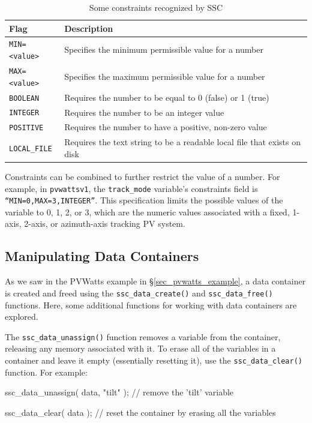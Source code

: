 \documentclass{scrartcl} %
\begin{document}
\begin{table}[ht]
\begin{center}
\begin{tabular}{ll}
Flag & Description\\
\hline
\texttt{MIN=<value>} & Specifies the minimum permissible value for a number \\
\texttt{MAX=<value>} & Specifies the maximum permissible value for a number \\
\texttt{BOOLEAN} & Requires the number to be equal to 0 (false) or 1 (true) \\
\texttt{INTEGER} & Requires the number to be an integer value \\
\texttt{POSITIVE} & Requires the number to have a positive, non-zero value \\
\texttt{LOCAL\_FILE} & Requires the text string to be a readable local file that exists on disk \\
\end{tabular}
\caption{Some constraints recognized by SSC}
\label{tab_constraints}
\end{center}
\end{table}

Constraints can be combined to further restrict the value of a number.  For example, in \texttt{pvwattsv1}, the \texttt{track\_mode} variable's constraints field is \texttt{``MIN=0,MAX=3,INTEGER''}.  This specification limits the possible values of the variable to 0, 1, 2, or 3, which are the numeric values associated with a fixed, 1-axis, 2-axis, or azimuth-axis tracking PV system.

\subsection{Manipulating Data Containers}
\label{sec_data_manip}

As we saw in the PVWatts example in \S\ref{sec_pvwatts_example}, a data container is created and freed using the \texttt{ssc\_data\_create()} and \texttt{ssc\_data\_free()} functions.  Here, some additional functions for working with data containers are explored.

The \texttt{ssc\_data\_unassign()} function removes a variable from the container, releasing any memory associated with it.  To erase all of the variables in a container and leave it empty (essentially resetting it), use the \texttt{ssc\_data\_clear()} function.  For example:

\begin{verbatimtab}
ssc_data_unassign( data, "tilt" ); // remove the 'tilt' variable

ssc_data_clear( data ); // reset the container by erasing all the variables
\end{verbatimtab}
\end{document}
